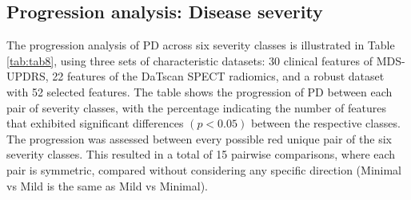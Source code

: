 \documentclass[twocolumn]{article}
\begin{document}
\subsection{Progression analysis: Disease severity}
The progression analysis of PD across six severity classes is illustrated in Table \ref{tab:tab8}, using three sets of characteristic datasets: 30 clinical features of MDS-UPDRS, 22 features of the DaTscan SPECT radiomics, and a robust dataset with 52 selected features. The table shows the progression of PD between each pair of severity classes, with the percentage indicating the number of features that exhibited significant differences $(p < 0.05)$ between the respective classes. The progression was assessed between every possible red unique pair of the six severity classes. This resulted in a total of 15 pairwise comparisons, where each pair is symmetric, compared without considering any specific direction (Minimal vs Mild is the same as Mild vs Minimal).

\begin{table}[ht!]
    \centering
    \caption{Progression between each pair of patient visits} 
    \label{tab:tab9}
    \renewcommand{\arraystretch}{1.5} 
\end{table}
\end{document}
